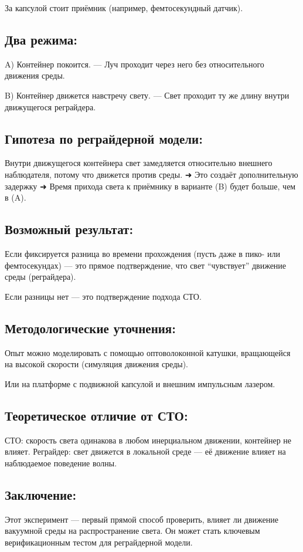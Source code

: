 \documentclass[12pt]{article}
\begin{document}
За капсулой стоит приёмник (например, фемтосекундный датчик).


\subsection*{Два режима:}
\par
A) Контейнер покоится.
— Луч проходит через него без относительного движения среды.
\par
B) Контейнер движется навстречу свету.
— Свет проходит ту же длину внутри движущегося реграйдера.

\subsection*{Гипотеза по реграйдерной модели:}
Внутри движущегося контейнера свет замедляется относительно внешнего наблюдателя, потому что движется против среды.
➜ Это создаёт дополнительную задержку
➜ Время прихода света к приёмнику в варианте (B) будет больше, чем в (A).

\subsection*{Возможный результат:}
Если фиксируется разница во времени прохождения (пусть даже в пико- или фемтосекундах) — это прямое подтверждение, что свет “чувствует” движение среды (реграйдера).

Если разницы нет — это подтверждение подхода СТО.

\subsection*{Методологические уточнения:}
Опыт можно моделировать с помощью оптоволоконной катушки, вращающейся на высокой скорости (симуляция движения среды).

Или на платформе с подвижной капсулой и внешним импульсным лазером.

\subsection*{Теоретическое отличие от СТО:}
СТО: скорость света одинакова в любом инерциальном движении, контейнер не влияет.
Реграйдер: свет движется в локальной среде — её движение влияет на наблюдаемое поведение волны.

\subsection*{Заключение:}
Этот эксперимент — первый прямой способ проверить, влияет ли движение вакуумной среды на распространение света.
Он может стать ключевым верификационным тестом для реграйдерной модели.
\end{document}
